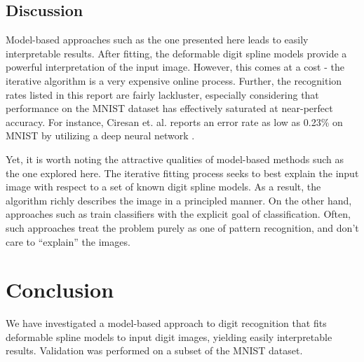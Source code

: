 \documentclass[oribibl]{llncs}
\begin{document}
\subsection{Discussion}

Model-based approaches such as the one presented here leads to easily interpretable results.
After fitting, the deformable digit spline models provide a powerful interpretation of the input image.
However, this comes at a cost - the iterative algorithm is a very expensive online process.
Further, the recognition rates listed in this report are fairly lackluster, especially considering that performance on the MNIST dataset has effectively saturated at near-perfect accuracy.
For instance, Ciresan et. al. reports an error rate as low as 0.23\% on MNIST by utilizing a deep neural network \cite{ciresan}.

Yet, it is worth noting the attractive qualities of model-based methods such as the one explored here.  
The iterative fitting process seeks to best explain the input image with respect to a set of known digit spline models.
As a result, the algorithm richly describes the image in a principled manner.
On the other hand, approaches such as \cite{ciresan} train classifiers with the explicit goal of classification.
Often, such approaches treat the problem purely as one of pattern recognition, and don't care to ``explain'' the images.

\section{Conclusion}

We have investigated a model-based approach to digit recognition that fits deformable spline models to input digit images, yielding easily interpretable results.
Validation was performed on a subset of the MNIST dataset.

 

\end{document}
